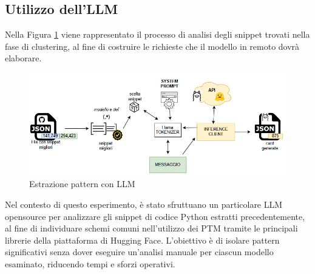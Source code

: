 \documentclass{article}
\begin{document}
\subsection{Utilizzo dell'LLM}
Nella Figura \ref{fig:ricerca_pattern} viene rappresentato il processo di analisi degli snippet trovati nella fase di clustering, al fine di costruire le richieste che il modello in remoto dovrà elaborare.
\begin{figure}[htbp]
    \centering
    \includegraphics[width=\linewidth]{images/approccio_ricerca_pattern.png}
    \caption{Estrazione pattern con LLM}
    \label{fig:ricerca_pattern}
\end{figure}
Nel contesto di questo esperimento, è stato sfruttuano un particolare LLM opensource per analizzare gli snippet di codice Python estratti precedentemente, al fine di individuare schemi comuni nell'utilizzo dei PTM tramite le principali librerie della piattaforma di Hugging Face.
L'obiettivo è di isolare pattern significativi senza dover eseguire un'analisi manuale per ciascun modello esaminato, riducendo tempi e sforzi operativi.
\end{document}
